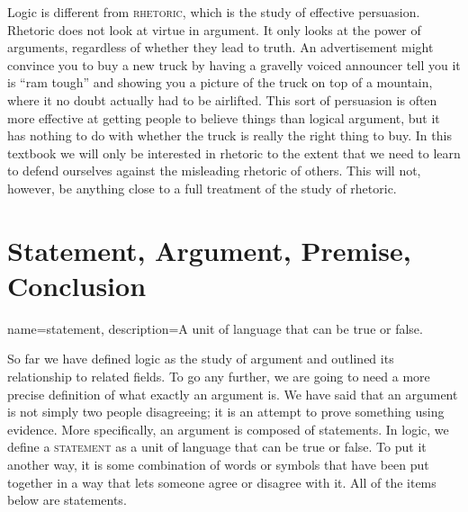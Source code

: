 Logic is different from \textsc{\gls{rhetoric}}, which is the study of effective persuasion. Rhetoric does not look at virtue in argument. It only looks at the power of arguments, regardless of whether they lead to truth. An advertisement might convince you to buy a new truck by having a gravelly voiced announcer tell you it is ``ram tough'' and showing you a picture of the truck on top of a mountain, where it no doubt actually had to be airlifted. This sort of persuasion is often more effective at getting people to believe things than logical argument, but it has nothing to do with whether the truck is really the right thing to buy. In this textbook we will only be interested in rhetoric to the extent that we need to learn to defend ourselves against the misleading rhetoric of others. This will not, however, be anything close to a full treatment of the study of rhetoric.



\section{Statement, Argument, Premise, Conclusion}
\label{sec:SAPC}

{
name=statement,
description={A unit of language that can be true or false.}
}

So far we have defined logic as the study of argument and outlined its relationship to related fields. To go any further, we are going to need a more precise definition of what exactly an argument is. We have said that an argument is not simply two people disagreeing; it is an attempt to prove something using evidence. More specifically, an argument is composed of statements. In logic, we define a \textsc{\gls{statement}} \label{def:statement} as a unit of language that can be true or false. To put it another way, it is some combination of words or symbols that have been put together in a way that lets someone agree or disagree with it. All of the items below are statements.

